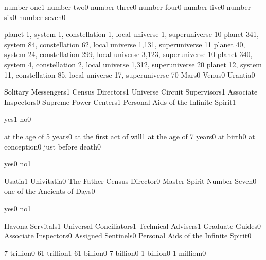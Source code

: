 {number one}{1}
{number two}{0}
{number three}{0}
{number four}{0}
{number five}{0}
{number six}{0}
{number seven}{0}
\qstop

{planet 1, system 1, constellation 1, local universe 1, superuniverse 1}{0}
{planet 341, system 84, constellation 62, local universe 1,131, superuniverse 1}{1}
{planet 40, system 24, constellation 299, local universe 3,123, superuniverse 1}{0}
{planet 340, system 4, constellation 2, local universe 1,312, superuniverse 2}{0}
{planet 12, system 11, constellation 85, local universe 17, superuniverse 7}{0}
{Mars}{0}
{Venus}{0}
{Urantia}{0}
\qstop

{Solitary Messengers}{1}
{Census Directors}{1}
{Universe Circuit Supervisors}{1}
{Associate Inspectors}{0}
{Supreme Power Centers}{1}
{Personal Aids of the Infinite Spirit}{1}
\qstop

{yes}{1}
{no}{0}
\qstop

{at the age of 5 years}{0}
{at the first act of will}{1}
{at the age of 7 years}{0}
{at birth}{0}
{at conception}{0}
{just before death}{0}
\qstop

{yes}{0}
{no}{1}
\qstop

{Usatia}{1}
{Univitatia}{0}
{The Father Census Director}{0}
{Master Spirit Number Seven}{0}
{one of the Ancients of Days}{0}
\qstop

{yes}{0}
{no}{1}
\qstop


{Havona Servitals}{1}
{Universal Conciliators}{1}
{Technical Advisers}{1}
{Graduate Guides}{0}
{Associate Inspectors}{0}
{Assigned Sentinels}{0}
{Personal Aids of the Infinite Spirit}{0}
\qstop

{7 trillion}{0}
{61 trillion}{1}
{61 billion}{0}
{7 billion}{0}
{1 billion}{0}
{1 milliom}{0}
\qstop

